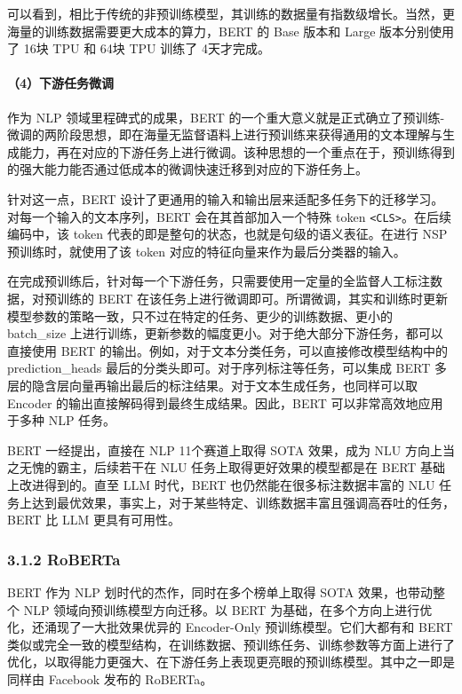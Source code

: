 \documentclass[
]{article}
\begin{document}
可以看到，相比于传统的非预训练模型，其训练的数据量有指数级增长。当然，更海量的训练数据需要更大成本的算力，BERT
的 Base 版本和 Large 版本分别使用了 16块 TPU 和 64块 TPU 训练了
4天才完成。

\paragraph{（4）下游任务微调}\label{ux4e0bux6e38ux4efbux52a1ux5faeux8c03}

作为 NLP 领域里程碑式的成果，BERT
的一个重大意义就是正式确立了预训练-微调的两阶段思想，即在海量无监督语料上进行预训练来获得通用的文本理解与生成能力，再在对应的下游任务上进行微调。该种思想的一个重点在于，预训练得到的强大能力能否通过低成本的微调快速迁移到对应的下游任务上。

针对这一点，BERT
设计了更通用的输入和输出层来适配多任务下的迁移学习。对每一个输入的文本序列，BERT
会在其首部加入一个特殊 token
\texttt{\textless{}CLS\textgreater{}}。在后续编码中，该 token
代表的即是整句的状态，也就是句级的语义表征。在进行 NSP
预训练时，就使用了该 token 对应的特征向量来作为最后分类器的输入。

在完成预训练后，针对每一个下游任务，只需要使用一定量的全监督人工标注数据，对预训练的
BERT
在该任务上进行微调即可。所谓微调，其实和训练时更新模型参数的策略一致，只不过在特定的任务、更少的训练数据、更小的
batch\_size
上进行训练，更新参数的幅度更小。对于绝大部分下游任务，都可以直接使用
BERT 的输出。例如，对于文本分类任务，可以直接修改模型结构中的
prediction\_heads 最后的分类头即可。对于序列标注等任务，可以集成 BERT
多层的隐含层向量再输出最后的标注结果。对于文本生成任务，也同样可以取
Encoder 的输出直接解码得到最终生成结果。因此，BERT
可以非常高效地应用于多种 NLP 任务。

BERT 一经提出，直接在 NLP 11个赛道上取得 SOTA 效果，成为 NLU
方向上当之无愧的霸主，后续若干在 NLU 任务上取得更好效果的模型都是在 BERT
基础上改进得到的。直至 LLM 时代，BERT 也仍然能在很多标注数据丰富的 NLU
任务上达到最优效果，事实上，对于某些特定、训练数据丰富且强调高吞吐的任务，BERT
比 LLM 更具有可用性。

\subsubsection{3.1.2 RoBERTa}\label{roberta}

BERT 作为 NLP 划时代的杰作，同时在多个榜单上取得 SOTA 效果，也带动整个
NLP 领域向预训练模型方向迁移。以 BERT
为基础，在多个方向上进行优化，还涌现了一大批效果优异的 Encoder-Only
预训练模型。它们大都有和 BERT
类似或完全一致的模型结构，在训练数据、预训练任务、训练参数等方面上进行了优化，以取得能力更强大、在下游任务上表现更亮眼的预训练模型。其中之一即是同样由
Facebook 发布的 RoBERTa。
\end{document}
